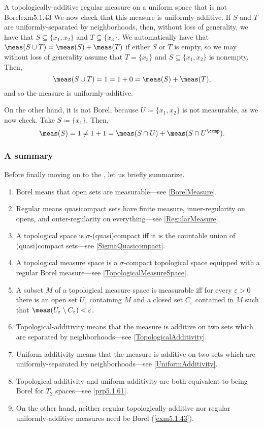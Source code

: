 \begin{exm}{A topologically-additive regular measure on a uniform space that is not Borel}{exm5.1.43}
We now check that this measure is uniformly-additive.  If $S$ and $T$ are uniformly-separated by neighborhoods, then, without loss of generality, we have that $S\subseteq \{ x_1,x_2\}$ and $T\subseteq \{ x_3\}$.  We automatically have that $\meas (S\cup T)=\meas (S)+\meas (T)$ if either $S$ or $T$ is empty, so we may without loss of generality assume that $T=\{ x_3\}$ and $S\subseteq \{ x_1,x_2\}$ is nonempty.  Then,
\begin{equation}
\meas (S\cup T)=1=1+0=\meas (S)+\meas (T),
\end{equation}
and so the measure is uniformly-additive.

On the other hand, it is not Borel, because $U\coloneqq \{ x_1,x_2\}$ is not measurable, as we now check.  Take $S\coloneqq \{ x_1\}$.  Then,
\begin{equation}
\meas (S)=1\neq 1+1=\meas (S\cap U)+\meas (S\cap U^{\comp}).
\end{equation}
\end{exm}

\subsubsection{A summary}

Before finally moving on to the , let us briefly summarize.
\begin{enumerate}
\item Borel means that open sets are measurable---see \cref{BorelMeasure}.
\item Regular means quasicompact sets have finite measure, inner-regularity on opens, and outer-regularity on everything---see \cref{RegularMeasure}.
\item A topological space is $\sigma$-(quasi)compact iff it is the countable union of (quasi)compact sets---see \cref{SigmaQuasicompact}.
\item A topological measure space is a $\sigma$-compact topological space equipped with a regular Borel measure---see \cref{TopologicalMeasureSpace}.
\item A subset $M$ of a topological measure space is measurable iff for every $\varepsilon >0$ there is an open set $U_{\varepsilon}$ containing $M$ and a closed set $C_{\varepsilon}$ contained in $M$ such that $\meas (U_{\varepsilon}\setminus C_{\varepsilon})<\varepsilon$.
\item Topological-additivity means that the measure is additive on two sets which are separated by neighborhoods---see \cref{TopologicalAdditivity}.
\item Uniform-additivity means that the measure is additive on two sets which are uniformly-separated by neighborhoods---see \cref{UniformAdditivity}.
\item Topological-additivity and uniform-additivity are both equivalent to being Borel for $T_2$ spaces---see \cref{prp5.1.61}.
\item On the other hand, neither regular topologically-additive nor regular uniformly-additive measures need be Borel (\cref{exm5.1.43}).
\end{enumerate}

